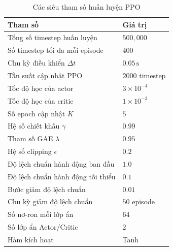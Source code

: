 \begin{table}[!t]
\caption{Các siêu tham số huấn luyện PPO}
\label{tab:ppo-hyperparameters}
\centering
\footnotesize
\renewcommand{\arraystretch}{1.1}
\begin{tabular}{p{}p{}}
\toprule
\textbf{Tham số} & \textbf{Giá trị} \\
\midrule
Tổng số timestep huấn luyện             & $500{,}000$ \\
Số timestep tối đa mỗi episode          & $400$ \\
Chu kỳ điều khiển $\Delta t$             & $0.05\,\text{s}$ \\
Tần suất cập nhật PPO                   & $2000$ timestep \\
Tốc độ học của actor                    & $3 \times 10^{-4}$ \\
Tốc độ học của critic                   & $1 \times 10^{-3}$ \\
Số epoch cập nhật $K$                    & $5$ \\
Hệ số chiết khấu $\gamma$                & $0.99$ \\
Tham số GAE $\lambda$                    & $0.95$ \\
Hệ số clipping $\epsilon$                & $0.2$ \\
Độ lệch chuẩn hành động ban đầu         & $1.0$ \\
Độ lệch chuẩn hành động tối thiểu       & $0.1$ \\
Bước giảm độ lệch chuẩn                 & $0.01$ \\
Chu kỳ giảm độ lệch chuẩn               & $50$ episode \\
Số nơ-ron mỗi lớp ẩn                    & $64$ \\
Số lớp ẩn Actor/Critic                  & $2$ \\
Hàm kích hoạt                           & Tanh \\
\bottomrule
\end{tabular}
\end{table}
